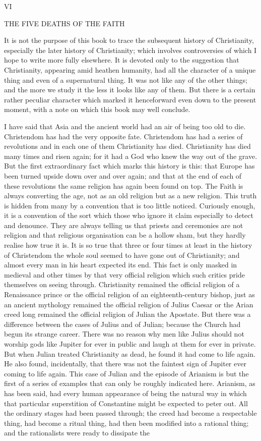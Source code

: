 VI

THE FIVE DEATHS OF THE FAITH

It is not the purpose of this book to trace the subsequent history of Christianity, especially the later history of Christianity; which involves controversies of which I hope to write more fully elsewhere. It is devoted only to the suggestion that Christianity, appearing amid heathen humanity, had all the character of a unique thing and even of a supernatural thing. It was not like any of the other things; and the more we study it the less it looks like any of them. But there is a certain rather peculiar character which marked it henceforward even down to the present moment, with a note on which this book may well conclude.

I have said that Asia and the ancient world had an air of being too old to die. Christendom has had the very opposite fate. Christendom has had a series of revolutions and in each one of them Christianity has died. Christianity has died many times and risen again; for it had a God who knew the way out of the grave. But the first extraordinary fact which marks this history is this: that Europe has been turned upside down over and over again; and that at the end of each of these revolutions the same religion has again been found on top. The Faith is always converting the age, not as an old religion but as a new religion. This truth is hidden from many by a convention that is too little noticed. Curiously enough, it is a convention of the sort which those who ignore it claim especially to detect and denounce. They are always telling us that priests and ceremonies are not religion and that religious organisation can be a hollow sham, but they hardly realise how true it is. It is so true that three or four times at least in the history of Christendom the whole soul seemed to have gone out of Christianity; and almost every man in his heart expected its end. This fact is only masked in medieval and other times by that very official religion which such critics pride themselves on seeing through. Christianity remained the official religion of a Renaissance prince or the official religion of an eighteenth-century bishop, just as an ancient mythology remained the official religion of Julius Caesar or the Arian creed long remained the official religion of Julian the Apostate. But there was a difference between the cases of Julius and of Julian; because the Church had begun its strange career. There was no reason why men like Julius should not worship gods like Jupiter for ever in public and laugh at them for ever in private. But when Julian treated Christianity as dead, he found it had come to life again. He also found, incidentally, that there was not the faintest sign of Jupiter ever coming to life again. This case of Julian and the episode of Arianism is but the first of a series of examples that can only be roughly indicated here. Arianism, as has been said, had every human appearance of being the natural way in which that particular superstition of Constantine might be expected to peter out. All the ordinary stages had been passed through; the creed had become a respectable thing, had become a ritual thing, had then been modified into a rational thing; and the rationalists were ready to dissipate the 